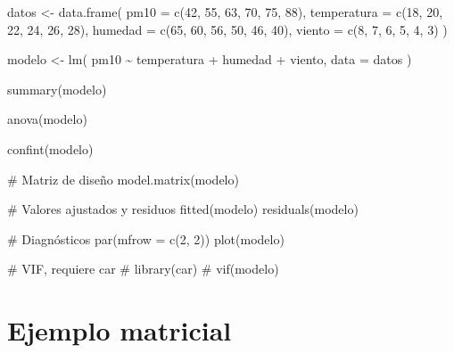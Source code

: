 \documentclass[
  spanish,
  10.5pt,
  letterpaper,
  DIV=11,
  numbers=noendperiod,
  oneside,
  open=any]{scrreprt}
\newenvironment{Shaded}{\begin{snugshade}}{\end{snugshade}}
\newcommand{\AttributeTok}[1]{\textcolor[rgb]{0.40,0.45,0.13}{#1}}
\newcommand{\CommentTok}[1]{\textcolor[rgb]{0.37,0.37,0.37}{#1}}
\newcommand{\DecValTok}[1]{\textcolor[rgb]{0.68,0.00,0.00}{#1}}
\newcommand{\FunctionTok}[1]{\textcolor[rgb]{0.28,0.35,0.67}{#1}}
\newcommand{\NormalTok}[1]{\textcolor[rgb]{0.00,0.23,0.31}{#1}}
\newcommand{\OtherTok}[1]{\textcolor[rgb]{0.00,0.23,0.31}{#1}}
\newcommand{\SpecialCharTok}[1]{\textcolor[rgb]{0.37,0.37,0.37}{#1}}
\theoremstyle{definition}
\theoremstyle{definition}
\theoremstyle{plain}
\theoremstyle{remark}
\begin{document}
\begin{Shaded}
\begin{Highlighting}[numbers=left,,]
\NormalTok{datos }\OtherTok{\textless{}{-}} \FunctionTok{data.frame}\NormalTok{(}
  \AttributeTok{pm10 =} \FunctionTok{c}\NormalTok{(}\DecValTok{42}\NormalTok{, }\DecValTok{55}\NormalTok{, }\DecValTok{63}\NormalTok{, }\DecValTok{70}\NormalTok{, }\DecValTok{75}\NormalTok{, }\DecValTok{88}\NormalTok{),}
  \AttributeTok{temperatura =} \FunctionTok{c}\NormalTok{(}\DecValTok{18}\NormalTok{, }\DecValTok{20}\NormalTok{, }\DecValTok{22}\NormalTok{, }\DecValTok{24}\NormalTok{, }\DecValTok{26}\NormalTok{, }\DecValTok{28}\NormalTok{),}
  \AttributeTok{humedad =} \FunctionTok{c}\NormalTok{(}\DecValTok{65}\NormalTok{, }\DecValTok{60}\NormalTok{, }\DecValTok{56}\NormalTok{, }\DecValTok{50}\NormalTok{, }\DecValTok{46}\NormalTok{, }\DecValTok{40}\NormalTok{),}
  \AttributeTok{viento =} \FunctionTok{c}\NormalTok{(}\DecValTok{8}\NormalTok{, }\DecValTok{7}\NormalTok{, }\DecValTok{6}\NormalTok{, }\DecValTok{5}\NormalTok{, }\DecValTok{4}\NormalTok{, }\DecValTok{3}\NormalTok{)}
\NormalTok{)}

\NormalTok{modelo }\OtherTok{\textless{}{-}} \FunctionTok{lm}\NormalTok{(}
\NormalTok{  pm10 }\SpecialCharTok{\textasciitilde{}}\NormalTok{ temperatura }\SpecialCharTok{+}\NormalTok{ humedad }\SpecialCharTok{+}\NormalTok{ viento,}
  \AttributeTok{data =}\NormalTok{ datos}
\NormalTok{)}

\FunctionTok{summary}\NormalTok{(modelo)}

\FunctionTok{anova}\NormalTok{(modelo)}

\FunctionTok{confint}\NormalTok{(modelo)}

\CommentTok{\# Matriz de diseño}
\FunctionTok{model.matrix}\NormalTok{(modelo)}

\CommentTok{\# Valores ajustados y residuos}
\FunctionTok{fitted}\NormalTok{(modelo)}
\FunctionTok{residuals}\NormalTok{(modelo)}

\CommentTok{\# Diagnósticos}
\FunctionTok{par}\NormalTok{(}\AttributeTok{mfrow =} \FunctionTok{c}\NormalTok{(}\DecValTok{2}\NormalTok{, }\DecValTok{2}\NormalTok{))}
\FunctionTok{plot}\NormalTok{(modelo)}

\CommentTok{\# VIF, requiere car}
\CommentTok{\# library(car)}
\CommentTok{\# vif(modelo)}
\end{Highlighting}
\end{Shaded}

\section*{Ejemplo matricial}\label{ejemplo-matricial}
\end{document}
